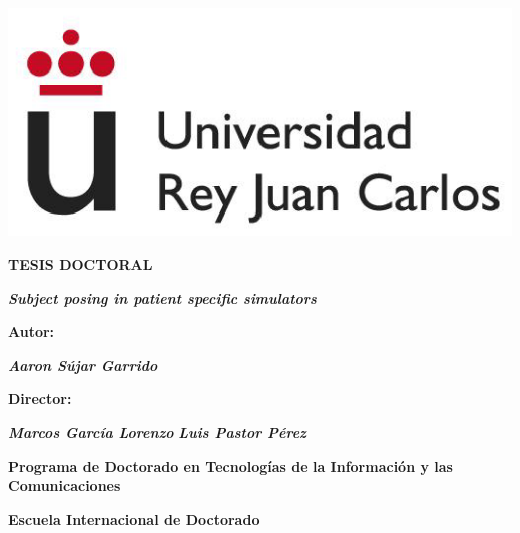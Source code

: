 \newcommand{\LyX}{L\kern-.1667em\lower.25em\hbox{Y}\kern-.125emX\spacefactor1000}
\newenvironment{LyXParagraphIndent}[1]%
{
  \begin{list}{}{%
    \setlength\topsep{0pt}%
    \addtolength{\leftmargin}{#1}
    \setlength\parsep{0pt plus 1pt}%
  }
  \item[]
}
{\end{list}}

\makeatother

\begin{center}

\thispagestyle{empty}

\vspace*{-0.5cm}

 {\includegraphics{IMG/logo_urjc.eps}} 

\vspace{1.5cm}

{\bf \huge  TESIS DOCTORAL}

\vspace{1.5cm}

{\bf \huge \itshape Subject posing in patient specific simulators}

\vspace{1.5cm}

  {\bf \large  Autor:}
  
  \vspace{0.5cm}
  {\bf \large \itshape Aaron Sújar Garrido}
 
  \vspace{1.5cm}
  
  {\bf Director:}
  
   \vspace{0.5cm}
  {\bf \large \itshape Marcos García Lorenzo}
  {\bf \large \itshape Luis Pastor Pérez}
  
  \vspace{1.5cm}
  
{\bf Programa de Doctorado en Tecnologías de la Información y las Comunicaciones}

{\bf Escuela Internacional de Doctorado}

\vfill{}
\the\year

\end{center}
\thispagestyle{empty}
\reversemarginpar

